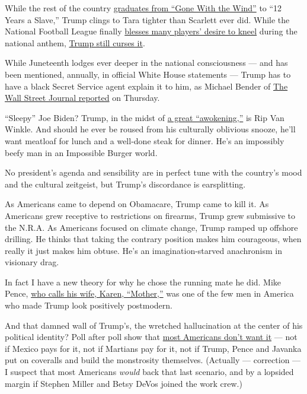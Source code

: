 While the rest of the country
\href{https://www.usatoday.com/story/entertainment/movies/2020/06/14/gone-wind-hbo-max-introduction-jacqueline-stewart/3188959001/}{graduates
from ``Gone With the Wind''} to ``12 Years a Slave,'' Trump clings to
Tara tighter than Scarlett ever did. While the National Football League
finally
\href{https://www.npr.org/sections/live-updates-protests-for-racial-justice/2020/06/05/871290906/nfl-on-kneeling-players-protests-we-were-wrong-commissioner-says}{blesses
many players' desire to kneel} during the national anthem,
\href{https://www.nytimes3xbfgragh.onion/2020/06/17/sports/football/trump-kaepernick-kneeling-anthem.html}{Trump
still curses it}.

While Juneteenth lodges ever deeper in the national consciousness ---
and has been mentioned, annually, in official White House statements ---
Trump has to have a black Secret Service agent explain it to him, as
Michael Bender of
\href{https://www.wsj.com/articles/trump-talks-juneteenth-john-bolton-economy-in-wsj-interview-11592493771}{The
Wall Street Journal reported} on Thursday.

``Sleepy'' Joe Biden? Trump, in the midst of
\href{https://www.vox.com/2019/3/22/18259865/great-awokening-white-liberals-race-polling-trump-2020}{a
great ``awokening,''} is Rip Van Winkle. And should he ever be roused
from his culturally oblivious snooze, he'll want meatloaf for lunch and
a well-done steak for dinner. He's an impossibly beefy man in an
Impossible Burger world.

No president's agenda and sensibility are in perfect tune with the
country's mood and the cultural zeitgeist, but Trump's discordance is
earsplitting.

As Americans came to depend on Obamacare, Trump came to kill it. As
Americans grew receptive to restrictions on firearms, Trump grew
submissive to the N.R.A. As Americans focused on climate change, Trump
ramped up offshore drilling. He thinks that taking the contrary position
makes him courageous, when really it just makes him obtuse. He's an
imagination-starved anachronism in visionary drag.

In fact I have a new theory for why he chose the running mate he did.
Mike Pence,
\href{https://www.politifact.com/article/2018/mar/27/does-mike-pence-call-his-wife-mother/}{who
calls his wife, Karen, ``Mother,''} was one of the few men in America
who made Trump look positively postmodern.

And that damned wall of Trump's, the wretched hallucination at the
center of his political identity? Poll after poll show that
\href{https://www.monmouth.edu/polling-institute/documents/monmouthpoll_us_042519.pdf/}{most
Americans don't want it} --- not if Mexico pays for it, not if Martians
pay for it, not if Trump, Pence and Javanka put on coveralls and build
the monstrosity themselves. (Actually --- correction --- I suspect that
most Americans \emph{would} back that last scenario, and by a lopsided
margin if Stephen Miller and Betsy DeVos joined the work crew.)

